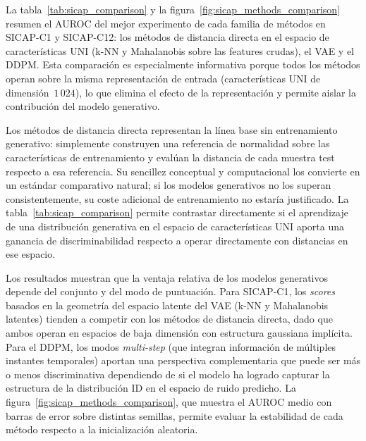 La tabla~\ref{tab:sicap_comparison} y la figura~\ref{fig:sicap_methods_comparison}
resumen el AUROC del mejor experimento de cada familia de métodos en SICAP-C1 y
SICAP-C12: los métodos de distancia directa en el espacio de características UNI
(k-NN y Mahalanobis sobre las features crudas), el VAE y el DDPM. Esta comparación
es especialmente informativa porque todos los métodos operan sobre la misma
representación de entrada (características UNI de dimensión~$1\,024$), lo que elimina
el efecto de la representación y permite aislar la contribución del modelo generativo.

Los métodos de distancia directa representan la línea base sin entrenamiento generativo:
simplemente construyen una referencia de normalidad sobre las características de
entrenamiento y evalúan la distancia de cada muestra test respecto a esa referencia.
Su sencillez conceptual y computacional los convierte en un estándar comparativo natural;
si los modelos generativos no los superan consistentemente, su coste adicional de
entrenamiento no estaría justificado. La tabla~\ref{tab:sicap_comparison} permite
contrastar directamente si el aprendizaje de una distribución generativa en el espacio
de características UNI aporta una ganancia de discriminabilidad respecto a operar
directamente con distancias en ese espacio.

Los resultados muestran que la ventaja relativa de los modelos generativos depende
del conjunto y del modo de puntuación. Para SICAP-C1, los \textit{scores} basados
en la geometría del espacio latente del VAE (k-NN y Mahalanobis latentes) tienden a
competir con los métodos de distancia directa, dado que ambos operan en espacios de
baja dimensión con estructura gaussiana implícita. Para el DDPM, los modos
\textit{multi-step} (que integran información de múltiples instantes temporales)
aportan una perspectiva complementaria que puede ser más o menos discriminativa
dependiendo de si el modelo ha logrado capturar la estructura de la distribución ID
en el espacio de ruido predicho. La figura~\ref{fig:sicap_methods_comparison}, que
muestra el AUROC medio con barras de error sobre distintas semillas, permite evaluar
la estabilidad de cada método respecto a la inicialización aleatoria.

\begin{table}[htbp]
    \centering
    \caption{Comparación entre métodos en SICAP: distancias de referencia
             (KNN, Mahalanobis) frente a modelos generativos (VAE, DDPM).
             Se muestra la configuración con mayor AUROC de cada familia;
             se resalta en negrita el mejor resultado global por conjunto.
             La tabla completa con todos los hiperparámetros figura en el
             apéndice~\ref{ch:apendice-figuras} (tabla~\ref{tab:sicap_results_full}).}
    \label{tab:sicap_comparison}
    
\end{table}

